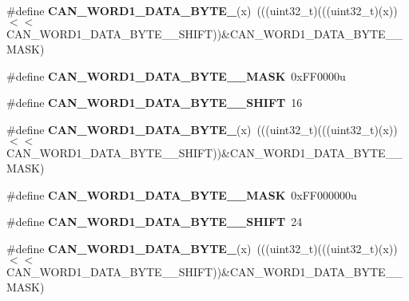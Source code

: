 \begin{DoxyCompactItemize}
\item 
\#define {\bfseries C\+A\+N\+\_\+\+W\+O\+R\+D1\+\_\+\+D\+A\+T\+A\+\_\+\+B\+Y\+T\+E\+\_}(x)~(((uint32\+\_\+t)(((uint32\+\_\+t)(x))$<$$<$C\+A\+N\+\_\+\+W\+O\+R\+D1\+\_\+\+D\+A\+T\+A\+\_\+\+B\+Y\+T\+E\+\_\+\_\+\+S\+H\+I\+FT))\&C\+A\+N\+\_\+\+W\+O\+R\+D1\+\_\+\+D\+A\+T\+A\+\_\+\+B\+Y\+T\+E\+\_\+\_\+\+M\+A\+SK)\hypertarget{group__CAN__Register__Masks_gac3aab1b91f004ba23493613f6e261bbc}{}\label{group__CAN__Register__Masks_gac3aab1b91f004ba23493613f6e261bbc}

\item 
\#define {\bfseries C\+A\+N\+\_\+\+W\+O\+R\+D1\+\_\+\+D\+A\+T\+A\+\_\+\+B\+Y\+T\+E\+\_\+\_\+\+M\+A\+SK}~0x\+F\+F0000u\hypertarget{group__CAN__Register__Masks_ga9762ba9b3f8288f68e3db1e0d2deccaf}{}\label{group__CAN__Register__Masks_ga9762ba9b3f8288f68e3db1e0d2deccaf}

\item 
\#define {\bfseries C\+A\+N\+\_\+\+W\+O\+R\+D1\+\_\+\+D\+A\+T\+A\+\_\+\+B\+Y\+T\+E\+\_\+\_\+\+S\+H\+I\+FT}~16\hypertarget{group__CAN__Register__Masks_ga74e324a0ea45adbeeafd694ddebc4e02}{}\label{group__CAN__Register__Masks_ga74e324a0ea45adbeeafd694ddebc4e02}

\item 
\#define {\bfseries C\+A\+N\+\_\+\+W\+O\+R\+D1\+\_\+\+D\+A\+T\+A\+\_\+\+B\+Y\+T\+E\+\_}(x)~(((uint32\+\_\+t)(((uint32\+\_\+t)(x))$<$$<$C\+A\+N\+\_\+\+W\+O\+R\+D1\+\_\+\+D\+A\+T\+A\+\_\+\+B\+Y\+T\+E\+\_\+\_\+\+S\+H\+I\+FT))\&C\+A\+N\+\_\+\+W\+O\+R\+D1\+\_\+\+D\+A\+T\+A\+\_\+\+B\+Y\+T\+E\+\_\+\_\+\+M\+A\+SK)\hypertarget{group__CAN__Register__Masks_ga822c2d94189ac5f7ea8239206c12bbbc}{}\label{group__CAN__Register__Masks_ga822c2d94189ac5f7ea8239206c12bbbc}

\item 
\#define {\bfseries C\+A\+N\+\_\+\+W\+O\+R\+D1\+\_\+\+D\+A\+T\+A\+\_\+\+B\+Y\+T\+E\+\_\+\_\+\+M\+A\+SK}~0x\+F\+F000000u\hypertarget{group__CAN__Register__Masks_ga9330617952319833e6c0ccf8d115144b}{}\label{group__CAN__Register__Masks_ga9330617952319833e6c0ccf8d115144b}

\item 
\#define {\bfseries C\+A\+N\+\_\+\+W\+O\+R\+D1\+\_\+\+D\+A\+T\+A\+\_\+\+B\+Y\+T\+E\+\_\+\_\+\+S\+H\+I\+FT}~24\hypertarget{group__CAN__Register__Masks_gaa7615281b358dfed5fb817b9c1fb157e}{}\label{group__CAN__Register__Masks_gaa7615281b358dfed5fb817b9c1fb157e}

\item 
\#define {\bfseries C\+A\+N\+\_\+\+W\+O\+R\+D1\+\_\+\+D\+A\+T\+A\+\_\+\+B\+Y\+T\+E\+\_}(x)~(((uint32\+\_\+t)(((uint32\+\_\+t)(x))$<$$<$C\+A\+N\+\_\+\+W\+O\+R\+D1\+\_\+\+D\+A\+T\+A\+\_\+\+B\+Y\+T\+E\+\_\+\_\+\+S\+H\+I\+FT))\&C\+A\+N\+\_\+\+W\+O\+R\+D1\+\_\+\+D\+A\+T\+A\+\_\+\+B\+Y\+T\+E\+\_\+\_\+\+M\+A\+SK)\hypertarget{group__CAN__Register__Masks_gab574a88bc531c0af5744f5de04e8db2a}{}\label{group__CAN__Register__Masks_gab574a88bc531c0af5744f5de04e8db2a}


\end{DoxyCompactItemize}
